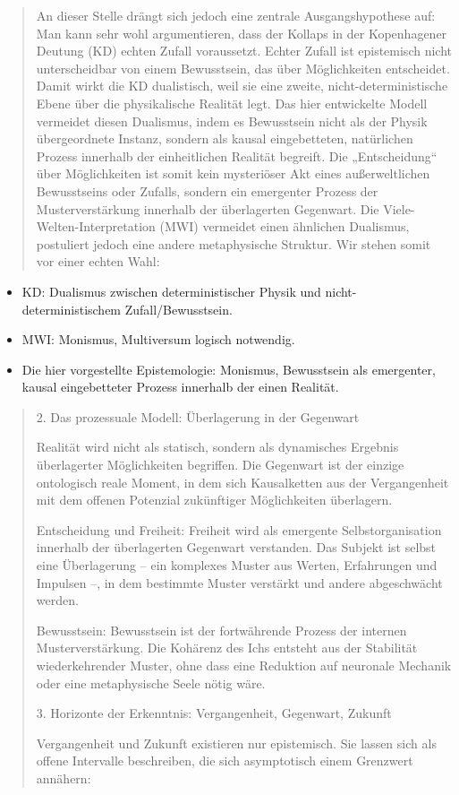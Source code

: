 \documentclass[
  ngerman,
]{article}
\begin{document}
\begin{quote}
An dieser Stelle drängt sich jedoch eine zentrale Ausgangshypothese auf:
Man kann sehr wohl argumentieren, dass der Kollaps in der Kopenhagener
Deutung (KD) echten Zufall voraussetzt. Echter Zufall ist epistemisch
nicht unterscheidbar von einem Bewusstsein, das über Möglichkeiten
entscheidet. Damit wirkt die KD dualistisch, weil sie eine zweite,
nicht-deterministische Ebene über die physikalische Realität legt. Das
hier entwickelte Modell vermeidet diesen Dualismus, indem es Bewusstsein
nicht als der Physik übergeordnete Instanz, sondern als kausal
eingebetteten, natürlichen Prozess innerhalb der einheitlichen Realität
begreift. Die „Entscheidung`` über Möglichkeiten ist somit kein
mysteriöser Akt eines außerweltlichen Bewusstseins oder Zufalls, sondern
ein emergenter Prozess der Musterverstärkung innerhalb der überlagerten
Gegenwart. Die Viele-Welten-Interpretation (MWI) vermeidet einen
ähnlichen Dualismus, postuliert jedoch eine andere metaphysische
Struktur. Wir stehen somit vor einer echten Wahl:
\end{quote}

\begin{itemize}
\item
  KD: Dualismus zwischen deterministischer Physik und
  nicht-deterministischem Zufall/Bewusstsein.
\item
  MWI: Monismus, Multiversum logisch notwendig.
\item
  Die hier vorgestellte Epistemologie: Monismus, Bewusstsein als
  emergenter, kausal eingebetteter Prozess innerhalb der einen Realität.
\end{itemize}

\begin{quote}
2. Das prozessuale Modell: Überlagerung in der Gegenwart

Realität wird nicht als statisch, sondern als dynamisches Ergebnis
überlagerter Möglichkeiten begriffen. Die Gegenwart ist der einzige
ontologisch reale Moment, in dem sich Kausalketten aus der Vergangenheit
mit dem offenen Potenzial zukünftiger Möglichkeiten überlagern.

Entscheidung und Freiheit: Freiheit wird als emergente
Selbstorganisation innerhalb der überlagerten Gegenwart verstanden. Das
Subjekt ist selbst eine Überlagerung -- ein komplexes Muster aus Werten,
Erfahrungen und Impulsen --, in dem bestimmte Muster verstärkt und
andere abgeschwächt werden.

Bewusstsein: Bewusstsein ist der fortwährende Prozess der internen
Musterverstärkung. Die Kohärenz des Ichs entsteht aus der Stabilität
wiederkehrender Muster, ohne dass eine Reduktion auf neuronale Mechanik
oder eine metaphysische Seele nötig wäre.

3. Horizonte der Erkenntnis: Vergangenheit, Gegenwart, Zukunft

Vergangenheit und Zukunft existieren nur epistemisch. Sie lassen sich
als offene Intervalle beschreiben, die sich asymptotisch einem Grenzwert
annähern:
\end{quote}
\end{document}
